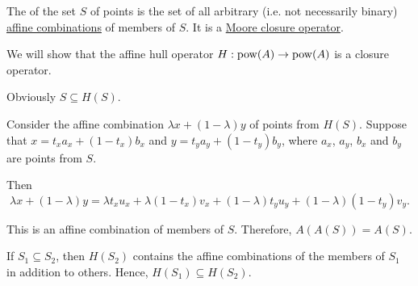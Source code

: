 \begin{definition}\label{def:affine_hull}\mimprovised
  The  of the set \( S \) of points is the set of all arbitrary (i.e. not necessarily binary) \hyperref[def:affine_combinations]{affine combinations} of members of \( S \). It is a \hyperref[def:moore_closure_operator]{Moore closure operator}.
\end{definition}
\begin{defproof}
  We will show that the affine hull operator \( H: \operatorname{pow}(A) \to \operatorname{pow}(A) \) is a closure operator.

   Obviously \( S \subseteq H(S) \).

   Consider the affine combination \( \lambda x + (1 - \lambda) y \) of points from \( H(S) \). Suppose that \( x = t_x a_x + (1 - t_x) b_x \) and \( y = t_y a_y + (1 - t_y) b_y \), where \( a_x \), \( a_y \), \( b_x \) and \( b_y \) are points from \( S \).

  Then
  \begin{equation*}
    \lambda x + (1 - \lambda) y
    =
    \lambda t_x u_x + \lambda (1 - t_x) v_x + (1 - \lambda) t_y u_y + (1 - \lambda) (1 - t_y) v_y.
  \end{equation*}

  This is an affine combination of members of \( S \). Therefore, \( A(A(S)) = A(S) \).

   If \( S_1 \subseteq S_2 \), then \( H(S_2) \) contains the affine combinations of the members of \( S_1 \) in addition to others. Hence, \( H(S_1) \subseteq H(S_2) \).
\end{defproof}

